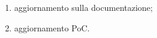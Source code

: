 \begin{enumerate}
   \item aggiornamento sulla documentazione;
   \item aggiornamento PoC.
\end{enumerate}